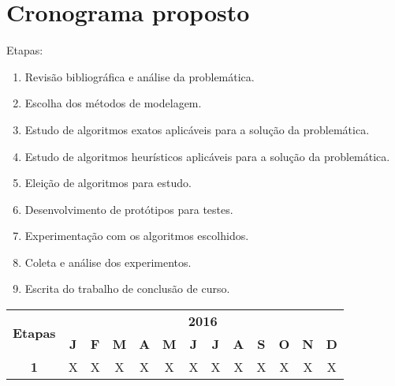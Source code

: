 \section{Cronograma proposto}
\label{cro}

Etapas:
\begin{enumerate}
        \item Revisão bibliográfica e análise da problemática.
        \item Escolha dos métodos de modelagem.
        \item Estudo de algoritmos exatos aplicáveis para a solução da problemática.
        \item Estudo de algoritmos heurísticos aplicáveis para a solução da problemática.
        \item Eleição de algoritmos para estudo.
        \item Desenvolvimento de protótipos para testes.
        \item Experimentação com os algoritmos escolhidos.
        \item Coleta e análise dos experimentos.
        \item Escrita do trabalho de conclusão de curso.
\end{enumerate}

\vspace{0.5cm}
{\tiny
\noindent \begin{tabular}{|c||c|c|c|c|c|c|c|c|c|c|c|c|}
  \hline
  \multirow{2}{*}{\textbf{\small{Etapas}}} & \multicolumn{12}{|c||}{\textbf{\small{2016}}} \\
  \cline{2-13}
   & \textbf{J} & \textbf{F} & \textbf{M} & \textbf{A} & \textbf{M} & \textbf{J} & \textbf{J} & \textbf{A} & \textbf{S} & \textbf{O} & \textbf{N} & \textbf{D} \\
  \hline \hline
  \textbf{\small{1}} & X & X & X & X & X & X & X & X & X & X & X & X \\ \hline
\end{tabular}
}
